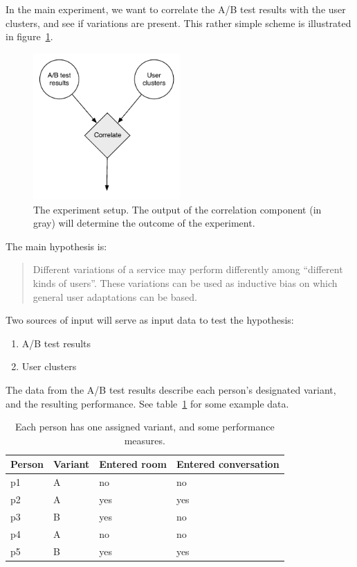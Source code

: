 In the main experiment, we want to correlate the A/B test results with the user clusters, and see if variations are present. This rather simple scheme is illustrated in figure~\ref{fig:experimental-setup}.

\begin{figure}[h]
  \centering
    \includegraphics[width=0.5\textwidth]{Figures/experimental-setup}
    \caption{The experiment setup. The output of the correlation component (in gray) will determine the outcome of the experiment.}
    \label{fig:experimental-setup}
\end{figure}

The main hypothesis is:

\begin{quote}
  Different variations of a service may perform differently among ``different kinds of users''. These variations can be used as inductive bias on which general user adaptations can be based.
\end{quote}

Two sources of input will serve as input data to test the hypothesis:

\begin{enumerate}
  \item A/B test results
  \item User clusters
\end{enumerate}

The data from the A/B test results describe each person's designated variant, and the resulting performance. See table~\ref{tab:person_variants} for some example data.

\begin{table}[h]
  \centering
  \begin{tabular}{|l|l|ll|}
    \hline
    Person & Variant & Entered room & Entered conversation \\ \hline
    p1     & A       & no           & no  \\
    p2     & A       & yes          & yes \\
    p3     & B       & yes          & no  \\
    p4     & A       & no           & no  \\
    p5     & B       & yes          & yes \\ \hline
  \end{tabular}
  \caption{Each person has one assigned variant, and some performance measures.}
  \label{tab:person_variants}
\end{table}

